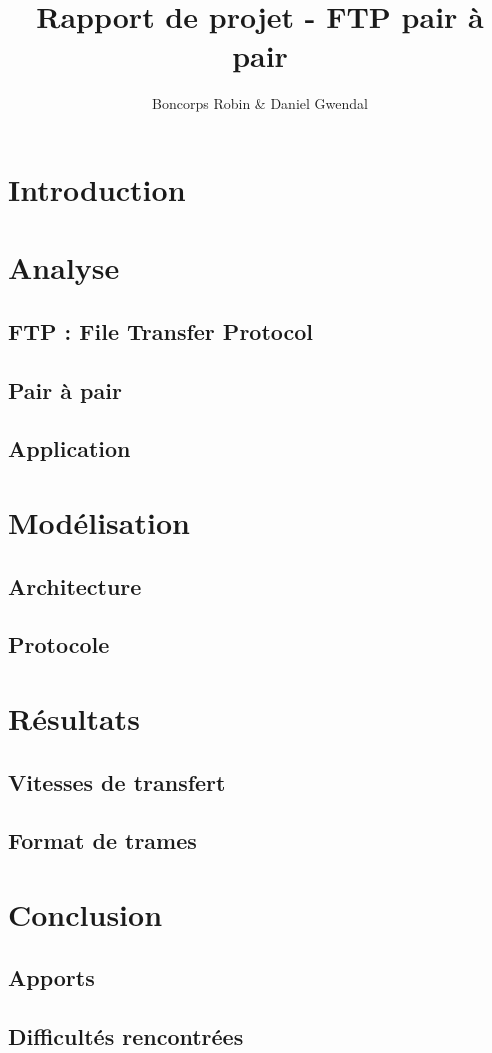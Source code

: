 \documentclass[a4paper, 11pt, french]{report}
\author{Boncorps Robin \& Daniel Gwendal}
\title{Rapport de projet - FTP pair à pair}
\begin{document}
\maketitle

\chapter{Introduction} %

\chapter{Analyse}
	\section{FTP : File Transfer Protocol} %
	\section{Pair à pair} %
	\section{Application} %

\chapter{Modélisation}
	\section{Architecture} %
	\section{Protocole} %

\chapter{Résultats}
	\section{Vitesses de transfert}  %
	\section{Format de trames} %

\chapter{Conclusion}
	\section{Apports} %
	\section{Difficultés rencontrées} %
	
\end{document}
